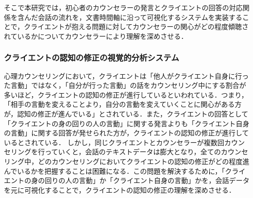 \documentclass[shuuron]{kuee}
\begin{document}
そこで本研究では，初心者のカウンセラーの発言とクライエントの回答の対応関係を含んだ会話の流れを，文書時間軸に沿って可視化するシステムを実装することで，クライエントが抱える問題に対してカウンセラーの関心がどの程度傾聴されているかについてカウンセラーにより理解を深めさせる．






\subsubsection{クライエントの認知の修正の視覚的分析システム}


心理カウンセリングにおいて，クライエントは「他人がクライエント自身に行った言動」ではなく，「自分が行った言動」の話をカウンセリング中にする割合が多いほど，クライエントの認知の修正が進行しているといわれている．つまり，「相手の言動を変えることより，自分の言動を変えていくことに関心がある方が，認知の修正が進んでいる」\cite{zokad}とされている．また，クライエントの回答として「クライエントの身の回りの人の言動」に関する発言よりも「クライエント自身の言動」に関する回答が発せられた方が，クライエントの認知の修正が進行しているとされている．
しかし，同じクライエントとカウンセラーが複数回カウンセリングを行っていくと，会話のテキストデータは膨大となり，全てのカウンセリング中，どのカウンセリングにおいてクライエントの認知の修正がどの程度進んでいるかを把握することは困難になる．この問題を解決するために，「クライエントの身の回りの人の言動」か「クライエント自身の言動」かを，会話データを元に可視化することで，クライエントの認知の修正の理解を深めさせる．
\end{document}
